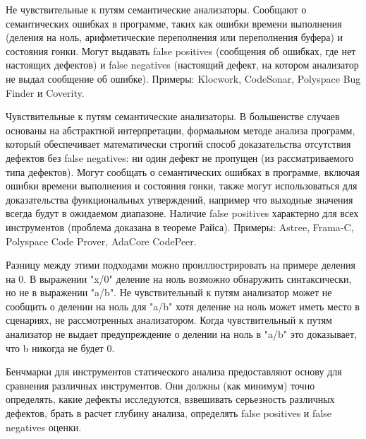 Не чувствительные к путям семантические анализаторы. Сообщают о семантических ошибках 
в программе, таких как ошибки времени выполнения (деления на ноль, арифметические переполнения
или переполнения буфера) и состояния гонки. Могут выдавать false positives
(сообщения об ошибках, где нет настоящих дефектов) и false negatives (настоящий дефект, на котором
анализатор не выдал сообщение об ошибке). Примеры: Klocwork\cite{Klocwork}, 
CodeSonar\cite{Codesonar}, Polyspace Bug Finder\cite{Polyspace}
и Coverity\cite{Coverity}.

Чувствительные к путям семантические анализаторы. В большенстве случаев основаны на абстрактной 
интерпретации, формальном методе анализа программ, который обеспечивает математически
строгий способ доказательства отсутствия дефектов без false negatives: ни один дефект 
не пропущен (из рассматриваемого типа дефектов). Могут сообщать о 
семантических ошибках в программе, включая ошибки времени выполнения и состояния гонки,
также могут использоваться для доказательства функциональных утверждений, например что 
выходные значения всегда будут в ожидаемом диапазоне. Наличие false positives характерно для всех инструментов
(проблема доказана в теореме Райса\cite{RiceT}).
Примеры: Astree\cite{Astree},
Frama-C\cite{Frama}, Polyspace Code Prover\cite{Polyspace2prover}, 
AdaCore CodePeer\cite{Codepeer}.

Разницу между этими подходами можно проиллюстрировать на примере деления на 0. В выражении 
"x/0" деление на ноль возможно обнаружить синтаксически, но не в выражении "a/b". Не чувствительный к путям  анализатор 
может не сообщить о делении на ноль для "a/b" хотя деление на ноль может иметь место в сценариях,
не рассмотренных анализатором. Когда чувствительный к путям анализатор не выдает предупреждение о делении на ноль
в "a/b" это доказывает, что b никогда не будет 0. 

Бенчмарки для инструментов статического анализа предоставляют основу для сравнения
различных инструментов. Они должны (как минимум) точно определять, какие дефекты исследуются,
взвешивать серьезность различных дефектов, %
брать в расчет глубину анализа, определять
false positives и false negatives оценки.



